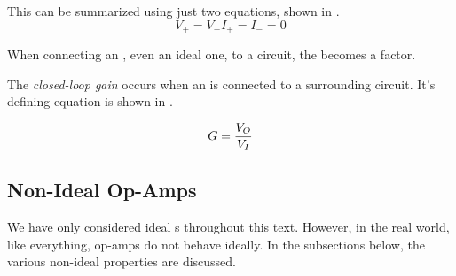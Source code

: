 This can be summarized using just two equations, shown in .
\begin{subequations}
  \begin{equation}\label{eq:Ideal_Op-Amp-Voltage}
    V_{+} = V_{-}
  \end{equation}
  \begin{equation}\label{eq:Ideal_Op-Amp-Current}
    I_{+} = I_{-} = 0
  \end{equation}
\end{subequations}

When connecting an , even an ideal one, to a circuit, the  becomes a factor.

\begin{definition}\label{def:Closed-Loop_Gain}
  The \emph{closed-loop gain} occurs when an  is connected to a surrounding circuit.
  It's defining equation is shown in .

  \begin{equation}\label{eq:Closed-Loop_Gain}
    G = \frac{V_{O}}{V_{I}}
  \end{equation}
\end{definition}

\subsection{Non-Ideal Op-Amps}\label{subsec:Non-Ideal_Op-Amps}
We have only considered ideal s throughout this text.
However, in the real world, like everything, op-amps do not behave ideally.
In the subsections below, the various non-ideal properties are discussed.


